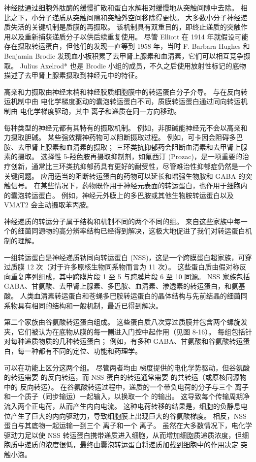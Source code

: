 神经肽通过细胞外肽酶的缓慢扩散和蛋白水解相对缓慢地从突触间隙中去除。
相比之下，小分子递质从突触间隙和突触外空间移除得更快。
大多数小分子神经递质失活的关键机制是质膜的再摄取。 
该机制具有双重目的，即终止递质的突触作用以及重新捕获递质分子以供后续重复使用。
尽管 Elliott 在 1914 年就假设可能存在摄取转运蛋白，但他们的发现一直等到 1958 年，当时 F. Barbara Hughes 和 Benjamin Brodie 发现血小板积累了去甲肾上腺素和血清素，它们可以相互竞争摄取。
Julius Axelrod* 也是 Brodie 小组的成员，不久之后使用放射性标记的底物描述了去甲肾上腺素摄取到神经元中的特征。


高亲和力摄取由神经末梢和神经胶质细胞膜中的转运蛋白分子介导。
与在反向转运机制中由  电化学梯度驱动的囊泡转运蛋白不同，质膜转运蛋白通过同向转运机制由  电化学梯度驱动，其中  离子和递质在同一方向移动。


每种类型的神经元都有其特有的摄取机制。
例如，非胆碱能神经元不会以高亲和力摄取胆碱。
某些强效精神药物可以阻断摄取过程。
例如，可卡因会阻碍多巴胺、去甲肾上腺素和血清素的摄取；
三环类抗抑郁药会阻断血清素和去甲肾上腺素的摄取。
选择性 5-羟色胺再摄取抑制剂，如氟西汀 (Prozac)，是一项重要的治疗创新，通常比三环类抗抑郁药具有更好的耐受性，尽管难治性抑郁症仍然是一个关键问题。
应用适当的阻断转运蛋白的药物可以延长和增强生物胺和 GABA 的突触信号。
在某些情况下，药物既作用于神经元表面的转运蛋白，也作用于细胞内的囊泡转运蛋白。
例如，神经元外膜上的多巴胺或其他生物胺转运蛋白以及 VMAT2 会主动摄取苯丙胺。


神经递质的转运分子属于结构和机制不同的两个不同的组。
来自这些家族中每一个的细菌同源物的高分辨率结构已经得到解决，这极大地促进了我们对转运蛋白机制的理解。


一组转运蛋白是神经递质钠同向转运蛋白 (NSS)，这是一个跨膜蛋白超家族，可穿过质膜 12 次（对于许多原核生物同系物而言为 11 次）。
这些蛋白质由假对称反向重复序列组成，其中跨膜片段 1 至 5 与跨膜片段 6 至 10 同源。
NSS 家族包括 GABA、甘氨酸、去甲肾上腺素、多巴胺、血清素、渗透素的转运蛋白，和氨基酸。
人类血清素转运蛋白和苍蝇多巴胺转运蛋白的晶体结构与先前结晶的细菌同系物具有相同的结构和一般机制，最近已得到解决。


第二个家族由谷氨酸转运蛋白组成。
这些蛋白质八次穿过质膜并包含两个螺旋发夹，它们被认为在底物从膜的每一侧进入门控中起作用（见图 8-16）。
每组包括针对每种递质物质的几种转运蛋白；
例如，有多种 GABA、甘氨酸和谷氨酸转运蛋白，每一种都有不同的定位、功能和药理学。


可以在功能上区分这两个组。
尽管两者均由  梯度提供的电化学势驱动，但谷氨酸的转运需要  的反向转运，而 NSS 蛋白的转运通常需要  的共转运（或原核同源物中的  反向转运）。
在谷氨酸转运过程中，递质的一个带负电荷的分子与三个  离子和一个质子（同步输运）一起输入，以换取一个  的输出。
这导致每个传输周期净流入两个正电荷，从而产生内向电流。
这种电荷转移的结果是，细胞的负静息电位产生了巨大的内向驱动力，导致细胞膜上出现巨大的谷氨酸梯度。
相反，NSS 蛋白与其底物一起运输一到三个  离子和一个  离子。
虽然在大多数情况下，电化学驱动力足以使 NSS 转运蛋白携带递质进入细胞，从而增加细胞质递质浓度，但细胞质中递质的浓度很低，最终由囊泡转运蛋白将递质加载到细胞中的作用决定 突触小泡。


